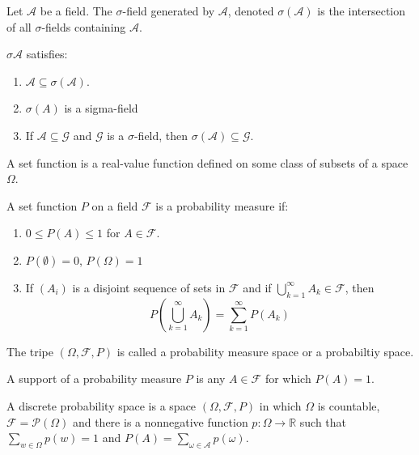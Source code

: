 \documentclass[12pt]{article}
\newcommand{\R}{\mathbb{R}}
\newcommand{\F}{\mathcal{F}}
\newcommand{\A}{\mathcal{A}}
\newcommand{\seq}{\subseteq}
\newcommand{\es}{\emptyset}
\newcommand{\mc}{\mathcal}
\newenvironment{defn}[2][Definition]{\begin{trivlist}
\item[\hskip \labelsep {\bfseries #1}\hskip \labelsep {\bfseries #2.}]}{\end{trivlist}}
\newenvironment{rmrk}[2][Remark]{\begin{trivlist}
\item[\hskip \labelsep {\bfseries #1}\hskip \labelsep {\bfseries #2.}]}{\end{trivlist}}
\begin{document}
\begin{defn}{2}
    Let $\mc A$ be a field. The $\sigma$-field generated by $\mc A$, denoted $\sigma (\mc A)$ is the intersection of all $\sigma$-fields containing $\mc A$.
\end{defn}

\begin{rmrk}{3}
    $\sigma \mc A$ satisfies:
    \begin{enumerate}
        \item $\A \seq \sigma(\A)$.
        \item $\sigma(A)$ is a sigma-field
        \item If $\A \seq \mc G$ and $\mc G$ is a $\sigma$-field, then $\sigma (\A) \seq \mc G$.
    \end{enumerate}
\end{rmrk}


\begin{defn}{4}
    A set function is a real-value function defined on some class of subsets of a space $\Omega$.
\end{defn}

\begin{defn}{5}
    A set function $P$ on a field $\F$ is a probability measure if:
    \begin{enumerate}
        \item $0 \leq P(A) \leq 1$ for $A \in \mc F$.
        \item $P(\es) = 0$, $P(\Omega) = 1$
        \item If $(A_i)$ is a disjoint sequence of sets in $\F$ and if $\bigcup_{k=1}^{\infty} A_k \in \F$, then
        \[ P \left ( \bigcup_{k=1}^{\infty} A_k \right) = \sum_{k=1}^{\infty} P(A_k) \]
    \end{enumerate}
    The tripe $(\Omega, \F, P)$ is called a probability measure space or a probabiltiy space.
\end{defn}

\begin{defn}{6}
    A support of a probability measure $P$ is any $A \in \F$ for which $P(A) = 1$.
\end{defn}

\begin{defn}{9}
    A discrete probability space is a space $(\Omega, \F, P)$ in which $\Omega$ is countable, $\F = \mc P (\Omega)$ and there is a nonnegative function $p: \Omega \to \R$ such that $\sum_{w \in \Omega} p(w) = 1$ and $P(A) = \sum_{\omega \in \A} p(\omega)$.
\end{defn}
\end{document}
